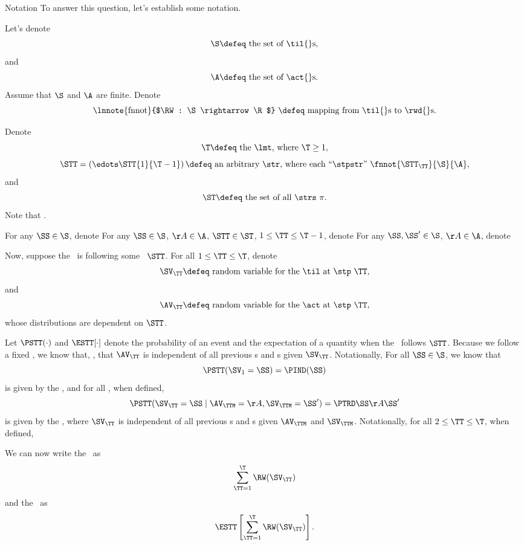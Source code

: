\begin{part}{Notation}
  To answer this question, let's establish some notation.

  Let's denote
  $$\text{$\S \defeq$ the set of \til{}s},$$
  and 
  $$\text{$\A \defeq$ the set of \act{}s.}$$
  Assume that $\S$ and $\A$ are finite.
  Denote
  $$\text{\lnnote{fnnot}{$\RW : \S \rightarrow \R$} $\defeq$ mapping from \til{}s to \rwd{}s.}$$

  Denote
  $$\text{$\T \defeq$ the \lmt, where $\T \ge 1$},$$
  $$\text{$\STT = \left(\edots\STT{1}{\T - 1}\right) \defeq$ an arbitrary \str, 
  where each ``\stpstr'' {$\fnnot{\STT_\TT}{\S}{\A}$}},$$
  and
  $$\text{$\ST \defeq$ the set of all \strs\ $\pi$}.$$
  Note that .

  For any $\SS \in \S$, denote
  For any $\SS \in \S$, $\AA \in \A$, $\STT \in \ST$, $1 \le \TT \le \T - 1$, denote
  For any $\SS,\SS' \in \S$, $\AA \in \A$, denote

  Now, suppose the \agt\ is following some \str\ $\STT$.
  For all $1 \le \TT \le \T$,
  denote
  $$\text{$\SV_\TT \defeq$ random variable for the \til\ at \stp\ $\TT$},$$
  and
  $$\text{$\AV_\TT \defeq$ random variable for the \act\ at \stp\ $\TT$},$$
  whose distributions are dependent on $\STT$.

  Let $\PSTT(\cdot)$ and $\ESTT[\cdot]$ denote the probability of an event
  and the expectation of a quantity
  when the \agt\ follows $\STT$.
  Because we follow a fixed \str, we know that, \pactdeffull,
   that
  $\AV_\TT$ is independent of all previous \til{}s and \act{}s given $\SV_\TT$.
  Notationally, \actcindpropfullg{\ctext{\lnnote{implgen}{$\actcindprop$}.}}
  For all $\SS \in \S$, we know that
  $$\PSTT(\SV_1 = \SS) = \PIND(\SS)$$
  is given by the \ind, and
  for all \rchreqsrng, when defined,
  $$
  \PSTT(\SV_\TT = \SS \mid \AV_\TTM = \AA, \SV_\TTM = \SS') =
  \PTRD\SS\AA{\SS'}
  $$
  is given by the \trd, where
  $\SV_\TT$ is independent of all previous \til{}s and \act{}s given $\AV_\TTM$ and $\SV_\TTM$.
  Notationally, for all $2 \le \TT \le \T$, when defined,

  We can now write the \trwd\ as
  $$\sum_{\TT = 1}^\T \RW(\SV_\TT)$$
  and the \atrwd\ as
  $$\ESTT\left[\sum_{\TT = 1}^\T \RW(\SV_\TT)\right].$$
\end{part}
